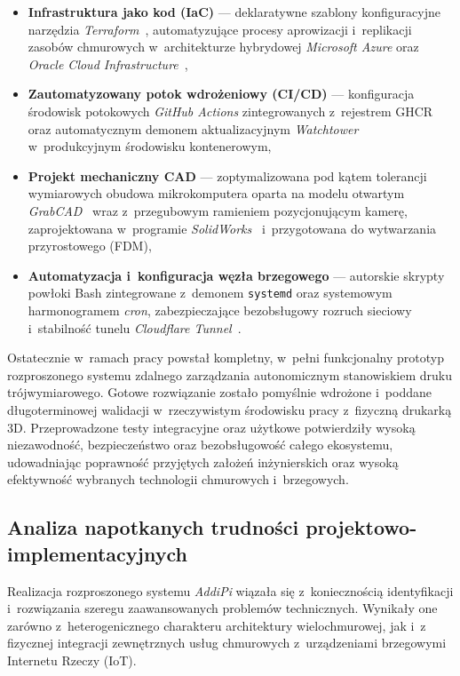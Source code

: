 \documentclass[a4paper,12pt,reqno]{article}
\begin{document}
\begin{itemize}
	\item \textbf{Infrastruktura jako kod (IaC)} --- deklaratywne szablony konfiguracyjne narzędzia \textit{Terraform}~\cite{terraform}, automatyzujące procesy aprowizacji i~replikacji zasobów chmurowych w~architekturze hybrydowej \textit{Microsoft Azure} oraz \textit{Oracle Cloud Infrastructure}~\cite{oci},
	\item \textbf{Zautomatyzowany potok wdrożeniowy (CI/CD)} --- konfiguracja środowisk potokowych \textit{GitHub Actions} zintegrowanych z~rejestrem GHCR oraz automatycznym demonem aktualizacyjnym \textit{Watchtower}~\cite{watchtower} w~produkcyjnym środowisku kontenerowym,
	\item \textbf{Projekt mechaniczny CAD} --- zoptymalizowana pod kątem tolerancji wymiarowych obudowa mikrokomputera oparta na modelu otwartym \textit{GrabCAD}~\cite{grabcad219} wraz z~przegubowym ramieniem pozycjonującym kamerę, zaprojektowana w~programie \textit{SolidWorks}~\cite{solidworks} i~przygotowana do wytwarzania przyrostowego (FDM),
	\item \textbf{Automatyzacja i~konfiguracja węzła brzegowego} --- autorskie skrypty powłoki Bash zintegrowane z~demonem \texttt{systemd} oraz systemowym harmonogramem \textit{cron}, zabezpieczające bezobsługowy rozruch sieciowy i~stabilność tunelu \textit{Cloudflare Tunnel}~\cite{cloudflare}.
\end{itemize}

Ostatecznie w~ramach pracy powstał kompletny, w~pełni funkcjonalny prototyp rozproszonego systemu zdalnego zarządzania autonomicznym stanowiskiem druku trójwymiarowego. Gotowe rozwiązanie zostało pomyślnie wdrożone i~poddane długoterminowej walidacji w~rzeczywistym środowisku pracy z~fizyczną drukarką 3D. Przeprowadzone testy integracyjne oraz użytkowe potwierdziły wysoką niezawodność, bezpieczeństwo oraz bezobsługowość całego ekosystemu, udowadniając poprawność przyjętych założeń inżynierskich oraz wysoką efektywność wybranych technologii chmurowych i~brzegowych.



\subsection{Analiza napotkanych trudności projektowo-implementacyjnych}

Realizacja rozproszonego systemu \textit{AddiPi} wiązała się z~koniecznością identyfikacji i~rozwiązania szeregu zaawansowanych problemów technicznych. Wynikały one zarówno z~heterogenicznego charakteru architektury wielochmurowej, jak i~z fizycznej integracji zewnętrznych usług chmurowych z~urządzeniami brzegowymi Internetu Rzeczy (IoT).
\end{document}
